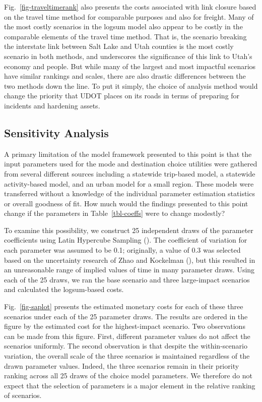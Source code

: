 \documentclass[]{ascelike-new}
\begin{document}
Fig.~\ref{fig-traveltimerank} also presents the costs associated with
link closure based on the travel time method for comparable purposes and
also for freight. Many of the most costly scenarios in the logsum model
also appear to be costly in the comparable elements of the travel time
method. That is, the scenario breaking the interstate link between Salt
Lake and Utah counties is the most costly scenario in both methods, and
underscores the significance of this link to Utah's economy and people.
But while many of the largest and most impactful scenarios have similar
rankings and scales, there are also drastic differences between the two
methods down the line. To put it simply, the choice of analysis method
would change the priority that UDOT places on its roads in terms of
preparing for incidents and hardening assets.

\subsection{Sensitivity Analysis}\label{sensitivity-analysis}

A primary limitation of the model framework presented to this point is
that the input parameters used for the mode and destination choice
utilities were gathered from several different sources including a
statewide trip-based model, a statewide activity-based model, and an
urban model for a small region. These models were transferred without a
knowledge of the individual parameter estimation statistics or overall
goodness of fit. How much would the findings presented to this point
change if the parameters in Table~\ref{tbl-coeffs} were to change
modestly?

To examine this possibility, we construct 25 independent draws of the
parameter coefficients using Latin Hypercube Sampling
(). The coefficient of
variation for each parameter was assumed to be 0.1; originally, a value
of 0.3 was selected based on the uncertainty research of Zhao and
Kockelman (), but this resulted in an
unreasonable range of implied values of time in many parameter draws.
Using each of the 25 draws, we ran the base scenario and three
large-impact scenarios and calculated the logsum-based costs.

Fig.~\ref{fig-saplot} presents the estimated monetary costs for each of
these three scenarios under each of the 25 parameter draws. The results
are ordered in the figure by the estimated cost for the highest-impact
scenario. Two observations can be made from this figure. First,
different parameter values do not affect the scenarios uniformly. The
second observation is that despite the within-scenario variation, the
overall scale of the three scenarios is maintained regardless of the
drawn parameter values. Indeed, the three scenarios remain in their
priority ranking across all 25 draws of the choice model parameters. We
therefore do not expect that the selection of parameters is a major
element in the relative ranking of scenarios.
\end{document}
